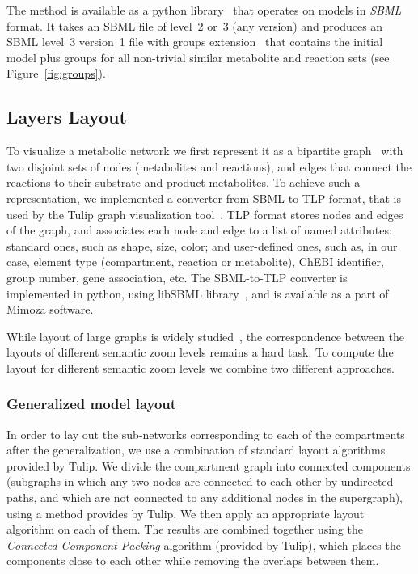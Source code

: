 \documentclass{bmcart}
\begin{document}
The method is available as a python library~\cite{Metamogen} that operates on models in \textit{SBML}~\cite{Hucka08} format. It takes an SBML file of level~2 or~3 (any version) and produces an SBML level~3 version~1 file with groups extension~\cite{Hucka2012} that contains the initial model plus groups for all non-trivial similar metabolite and reaction sets (see Figure~\ref{fig:groups}).


\subsection*{Layers Layout}
To visualize a metabolic network we first represent it as a bipartite graph~\cite{Diestel2012} with two disjoint sets of nodes (metabolites and reactions), and edges that connect the reactions to their substrate and product metabolites. To achieve such a representation, we implemented a converter from SBML to TLP format, that is used by the Tulip graph visualization tool~\cite{Auber04}. TLP format stores nodes and edges of the graph, and associates each node and edge to a list of named attributes: standard ones, such as shape, size, color; and user-defined ones, such as, in our case, element type (compartment, reaction or metabolite), ChEBI identifier, group number, gene association, etc. The SBML-to-TLP converter is implemented in python, using libSBML library~\cite{Bornstein2008}, and is available as a part of Mimoza software. 

While layout of large graphs is widely studied~\cite{Unwin2006}, the correspondence between the layouts of different semantic zoom levels remains a hard task. To compute the layout for different semantic zoom levels we combine two different approaches.

\subsubsection*{Generalized model layout}
In order to lay out the sub-networks corresponding to each of the compartments after the generalization, we use a combination of standard layout algorithms provided by Tulip. We divide the compartment graph into connected components (subgraphs in which any two nodes are connected to each other by undirected paths, and which are not connected to any additional nodes in the supergraph), using a method provides by Tulip. We then apply an appropriate layout algorithm on each of them. The results are combined together using the \emph{Connected Component Packing} algorithm (provided by Tulip), which places the components close to each other while removing the overlaps between them.
\end{document}
